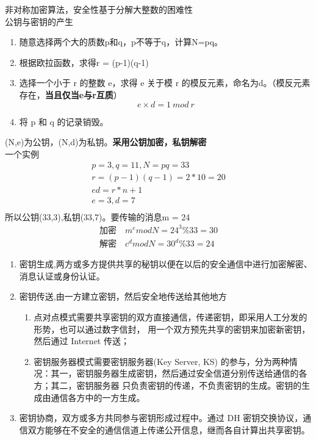 非对称加密算法，安全性基于分解大整数的困难性\\
公钥与密钥的产生
\begin{enumerate}
	\item 随意选择两个大的质数p和q，p不等于q，计算N=pq。
	\item 根据欧拉函数，求得r = (p-1)(q-1)
	\item 选择一个小于 r 的整数 e，求得 e 关于模 r 的模反元素，命名为d。（模反元素存在，\textbf{当且仅当e与r互质}）
	\begin{equation}\label{key}
	e\times d = 1\ mod\ r
	\end{equation}
	\item 将 p 和 q 的记录销毁。
\end{enumerate}
(N,e)为公钥，(N,d)为私钥。\textbf{采用公钥加密，私钥解密}\\
一个实例
\begin{gather}
 p = 3,q=11 , N = pq = 33\\
 r = (p-1)(q-1) = 2*10 = 20 \\
 ed = r * n + 1\\
 e = 3,d = 7\\
\end{gather}
所以公钥(33,3),私钥(33,7)。要传输的消息m = 24
\begin{gather}
 \text{加密}\quad m^e mod N = 24^3 \% 33 = 30\\
 \text{解密}\quad c^d mod N = 30 ^d \% 33 =24
\end{gather}


\begin{enumerate}
	\item 密钥生成,两方或多方提供共享的秘钥以便在以后的安全通信中进行加密解密、消息认证或身份认证。
	\item 密钥传送,由一方建立密钥，然后安全地传送给其他地方
	\begin{enumerate}
		\item 点对点模式需要共享密钥的双方直接通信，传递密钥，即采用人工分发的形势，也可以通过数字信封，
		用一个双方预先共享的密钥来加密新密钥，然后通过 Internet 传送；
		\item 密钥服务器模式需要密钥服务器(Key Server, KS)
		的参与，分为两种情况：其一，密钥服务器生成密钥，然后通过安全信道分别传送给通信的各方；其二，密钥服务器
		只负责密钥的传递，不负责密钥的生成。密钥的生成由通信各方中的一方生成。
	\end{enumerate}
	\item 密钥协商，双方或多方共同参与密钥形成过程中。通过 DH 密钥交换协议，通信双方能够在不安全的通信信道上传递公开信息，继而各自计算出共享密钥。
\end{enumerate}


